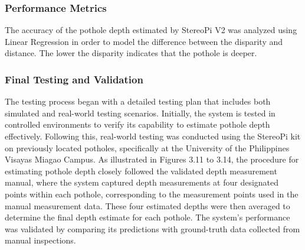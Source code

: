 \subsubsection{Performance Metrics}
The accuracy of the pothole depth estimated by StereoPi V2 was analyzed using Linear Regression in order to model the difference between the disparity and distance. The lower the disparity indicates that the pothole is deeper.





\subsubsection{Final Testing and Validation}
The testing process began with a detailed testing plan that includes both simulated and real-world testing scenarios. Initially, the system is tested in controlled environments to verify its capability to estimate pothole depth effectively. Following this, real-world testing was conducted using the StereoPi kit on previously located potholes, specifically at the University of the Philippines Visayas Miagao Campus. As illustrated in Figures 3.11 to 3.14, the procedure for estimating pothole depth closely followed the validated depth measurement manual, where the system captured depth measurements at four designated points within each pothole, corresponding to the measurement points used in the manual measurement data. These four estimated depths were then averaged to determine the final depth estimate for each pothole. The system’s performance was validated by comparing its predictions with ground-truth data collected from manual inspections.

